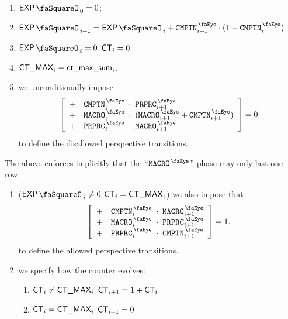 \begin{enumerate}
	\item $\expStamp_{0} = 0$;
	\item $\expStamp_{i + 1} = \expStamp_{i} + \isComputation_{i + 1} \cdot (1 - \isComputation_{i})$
	\item \If $\expStamp_{i} = 0$ \Then $\textsf{CT}_{i} = 0$
	\item $\textsf{CT\_MAX}_{i} = \textsf{ct\_max\_sum}_{i}$.
	\item we unconditionally impose
	      \[
		      \left[ \begin{array}{lrcl}
				      + & \isComputation_{i}   & \!\!\! \cdot \!\!\! & \isPreprocessing_{i + 1}                      \\
				      + & \isMacro_{i}         & \!\!\! \cdot \!\!\! & (\isMacro_{i + 1} + \isComputation  _{i + 1}) \\
				      + & \isPreprocessing_{i} & \!\!\! \cdot \!\!\! & \isMacro        _{i + 1}                      \\
			      \end{array} \right]
		      = 0
	      \]
	      to define the disallowed perspective transitions.
\end{enumerate}
\saNote{} The above enforces implicitly that the ``$\isMacro$'' phase may only last one row.
\begin{enumerate}[resume]
	\item \If \Big($\expStamp_{i} \neq 0$ \et $\textsf{CT}_{i} = \textsf{CT\_MAX}_{i}$\Big) \Then we also impose that
		\[
			\left[ \begin{array}{lrcl}
				+ & \isComputation_{i}   & \!\!\! \cdot \!\!\! & \isMacro          _{i + 1} \\
				+ & \isMacro_{i}         & \!\!\! \cdot \!\!\! & \isPreprocessing  _{i + 1} \\
				+ & \isPreprocessing_{i} & \!\!\! \cdot \!\!\! & \isComputation    _{i + 1} \\
			\end{array} \right]
			= 1.
		\]
	      to define the allowed perspective transitions.
	\item we specify how the counter evolves:
	      \begin{enumerate}
		      \item \If $\textsf{CT}_{i} \neq \textsf{CT\_MAX}_{i}$ \Then $\textsf{CT}_{i + 1} = 1 + \textsf{CT}_{i}$
		      \item \If $\textsf{CT}_{i} =    \textsf{CT\_MAX}_{i}$ \Then $\textsf{CT}_{i + 1} = 0$
	      \end{enumerate}
\end{enumerate}
